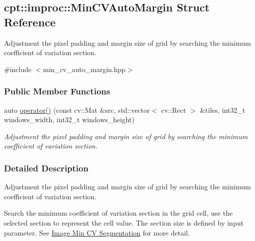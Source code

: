 \hypertarget{structcpt_1_1improc_1_1_min_c_v_auto_margin}{\subsection{cpt\-:\-:improc\-:\-:Min\-C\-V\-Auto\-Margin Struct Reference}
\label{structcpt_1_1improc_1_1_min_c_v_auto_margin}
}


Adjustment the pixel padding and margin size of grid by searching the minimum coefficient of variation section.  




{\ttfamily \#include $<$min\-\_\-cv\-\_\-auto\-\_\-margin.\-hpp$>$}

\subsubsection*{Public Member Functions}
\begin{DoxyCompactItemize}
\item 
auto \hyperlink{structcpt_1_1improc_1_1_min_c_v_auto_margin_a171e12b5e79a117bc0a906606c43d7ea}{operator()} (const cv\-::\-Mat \&src, std\-::vector$<$ cv\-::\-Rect $>$ \&tiles, int32\-\_\-t windows\-\_\-width, int32\-\_\-t windows\-\_\-height)
\begin{DoxyCompactList}\small\item\em Adjustment the pixel padding and margin size of grid by searching the minimum coefficient of variation section. \end{DoxyCompactList}\end{DoxyCompactItemize}


\subsubsection{Detailed Description}
Adjustment the pixel padding and margin size of grid by searching the minimum coefficient of variation section. 

Search the minimum coefficient of variation section in the grid cell, use the selected section to represent the cell value. The section size is defined by input parameter. See \hyperlink{improc_min_cv_auto_margin}{Image Min C\-V Segmentation} for more detail. 

